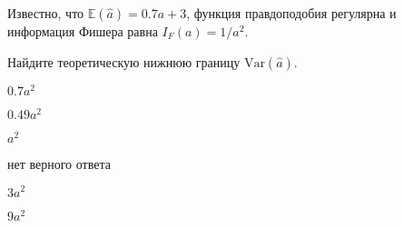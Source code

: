 
\begin{question}
Известно, что \(\mathbb{E}(\hat a) = 0.7a + 3\), функция правдоподобия
регулярна и информация Фишера равна \(I_F(a) = 1/a^2\).

Найдите теоретическую нижнюю границу \(\mathrm{Var}(\hat a)\).
\begin{answerlist}
  \item \(0.7 a^2\)
  \item \(0.49 a^2\)
  \item \(a^2\)
  \item нет верного ответа
  \item \(3 a^2\)
  \item \(9 a^2\)
\end{answerlist}
\end{question}


